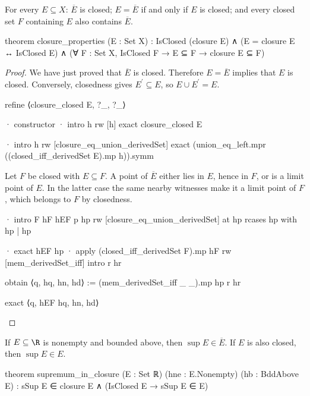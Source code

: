 \begin{proposition}
  \label{ma:thm:properties-of-closure}
  For every $E\subseteq X$: $\overline E$ is closed; $E=\overline E$ if and only if $E$ is closed;
  and every closed set $F$ containing $E$ also contains $\overline E$.

  \begin{lean}
    theorem closure_properties (E : Set X) :
        IsClosed (closure E) ∧ (E = closure E ↔ IsClosed E) ∧
        (∀ F : Set X, IsClosed F → E ⊆ F → closure E ⊆ F)
  \end{lean}
\end{proposition}

\begin{proof}
  We have just proved that $\overline E$ is closed.
  Therefore $E=\overline E$ implies that $E$ is closed.
  Conversely, closedness gives $E^{\prime}\subseteq E$, so $E\cup E^{\prime}=E$.

  \begin{lean}
    refine ⟨closure_closed E, ?_, ?_⟩

    · constructor
      · intro h
        rw [h]
        exact closure_closed E

      · intro h
        rw [closure_eq_union_derivedSet]
        exact (union_eq_left.mpr ((closed_iff_derivedSet E).mp h)).symm
  \end{lean}

  Let $F$ be closed with $E\subseteq F$.
  A point of $\overline E$ either lies in $E$, hence in $F$, or is a limit point of $E$.
  In the latter case the same nearby witnesses make it a limit point of $F$, which belongs to $F$
  by closedness.

  \begin{lean}
    · intro F hF hEF p hp
      rw [closure_eq_union_derivedSet] at hp
      rcases hp with hp | hp

      · exact hEF hp
      · apply (closed_iff_derivedSet F).mp hF
        rw [mem_derivedSet_iff]
        intro r hr

        obtain ⟨q, hq, hn, hd⟩ := (mem_derivedSet_iff _ _).mp hp r hr

        exact ⟨q, hEF hq, hn, hd⟩
  \end{lean}

\end{proof}

\begin{proposition}
  \label{ma:thm:supremum-in-closure}
  If $E\subseteq\R$ is nonempty and bounded above, then $\sup E\in\overline E$.
  If $E$ is also closed, then $\sup E\in E$.

  \begin{lean}
    theorem supremum_in_closure (E : Set ℝ) (hne : E.Nonempty) (hb : BddAbove E) :
        sSup E ∈ closure E ∧ (IsClosed E → sSup E ∈ E)
  \end{lean}
\end{proposition}

